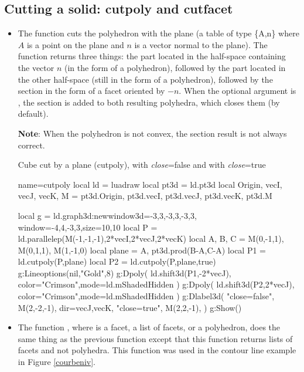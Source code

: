\subsection{Cutting a solid: cutpoly and cutfacet}

\begin{itemize}
    \item The function  cuts the polyhedron  with the plane  (a ​​table of type \{A,n\} where $A$ is a point on the plane and $n$ is a vector normal to the plane). The function returns three things: the part located in the half-space containing the vector $n$ (in the form of a polyhedron), followed by the part located in the other half-space (still in the form of a polyhedron), followed by the section in the form of a facet oriented by $-n$. When the optional argument  is \true, the section is added to both resulting polyhedra, which closes them (\false by default).

\textbf{Note}: When the polyhedron  is not convex, the section result is not always correct.

\begin{demo}{Cube cut by a plane (cutpoly), with \emph{close}=false and with \emph{close}=true}
\begin{luadraw}{name=cutpoly}
local ld = luadraw
local pt3d = ld.pt3d
local Origin, vecI, vecJ, vecK, M = pt3d.Origin, pt3d.vecI, pt3d.vecJ, pt3d.vecK, pt3d.M

local g = ld.graph3d:new{window3d={-3,3,-3,3,-3,3}, window={-4,4,-3,3},size={10,10}}
local P = ld.parallelep(M(-1,-1,-1),2*vecI,2*vecJ,2*vecK)
local A, B, C = M(0,-1,1), M(0,1,1), M(1,-1,0)
local plane = {A, pt3d.prod(B-A,C-A)}
local P1 = ld.cutpoly(P,plane)
local P2 = ld.cutpoly(P,plane,true)
g:Lineoptions(nil,"Gold",8)
g:Dpoly( ld.shift3d(P1,-2*vecJ), {color="Crimson",mode=ld.mShadedHidden} )
g:Dpoly( ld.shift3d(P2,2*vecJ), {color="Crimson",mode=ld.mShadedHidden} )
g:Dlabel3d(
    "close=false", M(2,-2,-1), {dir={vecJ,vecK}},
    "close=true", M(2,2,-1), {} )
g:Show()
\end{luadraw}
\end{demo}

    \item The function , where  is a facet, a list of facets, or a polyhedron, does the same thing as the previous function except that this function returns lists of facets and not polyhedra. This function was used in the contour line example in Figure \ref{courbeniv}.
\end{itemize}

